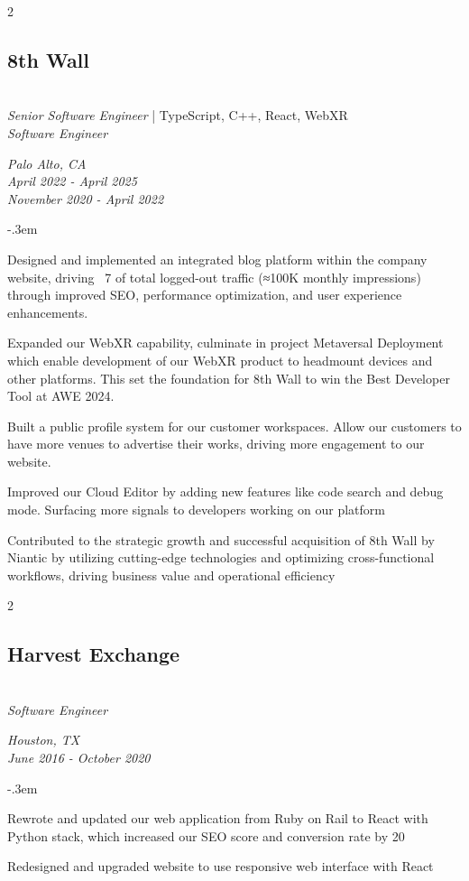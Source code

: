 \documentclass{article}
\let\olditemize=\itemize \let\endolditemize=\enditemize
\renewenvironment{itemize}{\olditemize[topsep=0em] \itemsep-.3em}{\endolditemize}
\newenvironment{twocolentry}[2][]{
    \def\secondColumn{#2}
    \raggedright
    \setcolumnwidth{\fill, 6cm}
    \begin{paracol}{2}
}{
    \switchcolumn \raggedleft \secondColumn
    \end{paracol}
} %
\begin{document}
\begin{twocolentry}{
  \textit{Palo Alto, CA} \\
  \textit{April 2022 - April 2025} \\
  \textit{November 2020 - April 2022}
}
\subsection{8th Wall}\hfill\\
\textit{Senior Software Engineer} | TypeScript, C++, React, WebXR \\
\textit{Software Engineer}
\end{twocolentry}
\begin{itemize}
  \item Designed and implemented an integrated blog platform within the company website, driving ~7%
  of total logged-out traffic (≈100K monthly impressions) through improved SEO, performance
  optimization, and user experience enhancements.
  \item Expanded our WebXR capability, culminate in project Metaversal Deployment which enable
  development of our WebXR product to headmount devices and other platforms. This set the foundation
  for 8th Wall to win the Best Developer Tool at AWE 2024.
  \item Built a public profile system for our customer workspaces. Allow our customers to have more
  venues to advertise their works, driving more engagement to our website. 
  \item Improved our Cloud Editor by adding new features like code search and debug mode. Surfacing
  more signals to developers working on our platform
  \item Contributed to the strategic growth and successful acquisition of 8th Wall by Niantic by
  utilizing cutting-edge technologies and optimizing cross-functional workflows, driving business
  value and operational efficiency
\end{itemize}

\begin{twocolentry}{
  \textit{Houston, TX} \\
  \textit{June 2016 - October 2020} \\
}
\subsection{Harvest Exchange}\hfill\\
\textit{Software Engineer}
\end{twocolentry}
\begin{itemize}
  \item Rewrote and updated our web application from Ruby on Rail to React with Python stack, which
  increased our SEO score and conversion rate by 20%
  \item Redesigned and upgraded website to use responsive web interface with React
\end{itemize}
\end{document}
